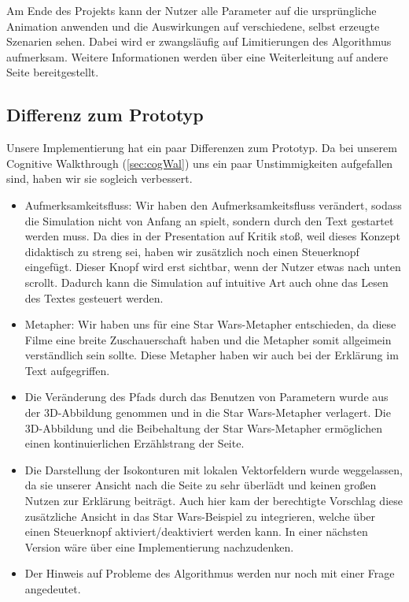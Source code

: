 Am Ende des Projekts kann der Nutzer alle Parameter auf die ursprüngliche Animation anwenden und die Auswirkungen auf verschiedene, selbst erzeugte Szenarien sehen. Dabei wird er zwangsläufig auf Limitierungen des Algorithmus aufmerksam. Weitere Informationen werden über eine Weiterleitung auf andere Seite bereitgestellt.

\subsection{Differenz zum Prototyp}
Unsere Implementierung hat ein paar Differenzen zum Prototyp.
Da bei unserem Cognitive Walkthrough (\vref{sec:cogWal}) uns ein paar Unstimmigkeiten aufgefallen sind, haben wir sie sogleich verbessert.
\begin{itemize}
	\item Aufmerksamkeitsfluss: Wir haben den Aufmerksamkeitsfluss verändert, sodass die Simulation nicht von Anfang an spielt, sondern durch den Text gestartet werden muss. Da dies in der Presentation auf Kritik stoß, weil dieses Konzept didaktisch zu streng sei, haben wir zusätzlich noch einen Steuerknopf eingefügt. Dieser Knopf wird erst sichtbar, wenn der Nutzer etwas nach unten scrollt. Dadurch kann die Simulation auf intuitive Art auch ohne das Lesen des Textes gesteuert werden.
	\item Metapher: Wir haben uns für eine Star Wars-Metapher entschieden, da diese Filme eine breite Zuschauerschaft haben und die Metapher somit allgeimein verständlich sein sollte. Diese Metapher haben wir auch bei der Erklärung im Text aufgegriffen.
	\item Die Veränderung des Pfads durch das Benutzen von Parametern wurde aus der 3D-Abbildung genommen und in die Star Wars-Metapher verlagert. Die 3D-Abbildung und die Beibehaltung der Star Wars-Metapher ermöglichen einen kontinuierlichen Erzählstrang der Seite.
	\item Die Darstellung der Isokonturen mit lokalen Vektorfeldern wurde weggelassen, da sie unserer Ansicht nach die Seite zu sehr überlädt und keinen großen Nutzen zur Erklärung beiträgt. Auch hier kam der berechtigte Vorschlag diese zusätzliche Ansicht in das Star Wars-Beispiel zu integrieren, welche über einen Steuerknopf aktiviert/deaktiviert werden kann. In einer nächsten Version wäre über eine Implementierung nachzudenken.
	\item Der Hinweis auf Probleme des Algorithmus werden nur noch mit einer Frage angedeutet. 
\end{itemize}

